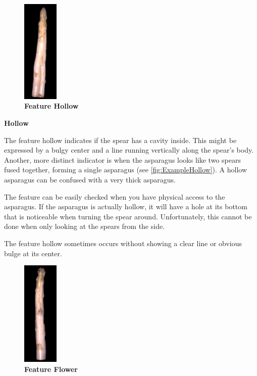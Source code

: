 \newpage

\begin{figure}
  \begin{center}
    \includegraphics[width=0.15\textwidth]{Figures/chapter03/example_img_hollow.png}
  \end{center}
  \vspace{-15pt}
  \caption[Example Image Feature Hollow]{ \textbf{Feature Hollow}}
  \vspace{10pt}
  \label{fig:ExampleHollow}
\end{figure}

\textbf{Hollow}

The feature hollow indicates if the spear has a cavity inside.
This might be expressed by a bulgy center and a line running vertically along the spear’s body. Another, more distinct indicator is when the asparagus looks like two spears fused together, forming a single asparagus (see \autoref{fig:ExampleHollow}). A hollow asparagus can be confused with a very thick asparagus.

The feature can be easily checked when you have physical access to the asparagus. If the asparagus is actually hollow, it will have a hole at its bottom that is noticeable when turning the spear around. Unfortunately, this cannot be done when only looking at the spears from the side.

The feature hollow sometimes occurs without showing a clear line or obvious bulge at its center.

\begin{figure}
  \begin{center}
    \includegraphics[width=0.15\textwidth]{Figures/chapter03/example_img_flower.png}
  \end{center}
  \vspace{-15pt}
  \caption[Example Image Feature Flower]{ \textbf{Feature Flower}}
  \vspace{-10pt}
  \label{fig:ExampleFlower}
\end{figure}

